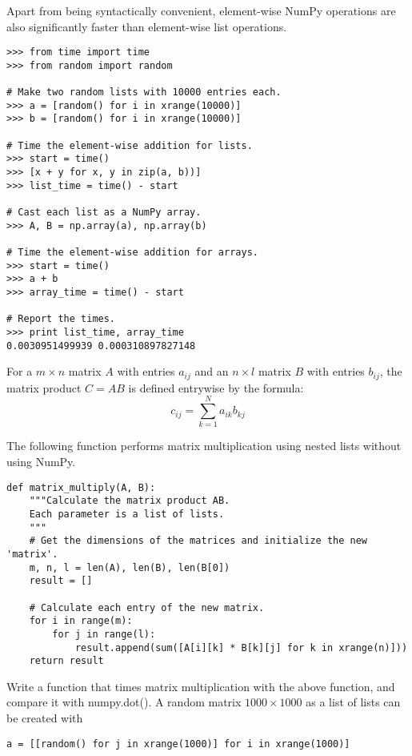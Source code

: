 Apart from being syntactically convenient, element-wise NumPy operations are also significantly faster than element-wise list operations.

\begin{lstlisting}
>>> from time import time
>>> from random import random

# Make two random lists with 10000 entries each.
>>> a = [random() for i in xrange(10000)]
>>> b = [random() for i in xrange(10000)]

# Time the element-wise addition for lists.
>>> start = time()
>>> [x + y for x, y in zip(a, b))]
>>> list_time = time() - start

# Cast each list as a NumPy array.
>>> A, B = np.array(a), np.array(b)

# Time the element-wise addition for arrays.
>>> start = time()
>>> a + b
>>> array_time = time() - start

# Report the times.
>>> print list_time, array_time
0.0030951499939 0.000310897827148
\end{lstlisting}

\begin{problem} %
For a $m\times n$ matrix $A$ with entries $a_{ij}$ and an $n\times l$ matrix $B$ with entries $b_{ij}$, the matrix product $C = AB$ is defined entrywise by the formula:
\[c_{ij} = \sum_{k=1}^N a_{ik}b_{kj}\]

The following function performs matrix multiplication using nested lists without using NumPy.

\begin{lstlisting}
def matrix_multiply(A, B):
    """Calculate the matrix product AB.
    Each parameter is a list of lists.
    """
    # Get the dimensions of the matrices and initialize the new 'matrix'.
    m, n, l = len(A), len(B), len(B[0])
    result = []

    # Calculate each entry of the new matrix.
    for i in range(m):
        for j in range(l):
            result.append(sum([A[i][k] * B[k][j] for k in xrange(n)]))
    return result
\end{lstlisting}

Write a function that times matrix multiplication with the above function, and compare it with numpy.dot().
A random matrix $1000\times 1000$ as a list of lists can be created with

\begin{lstlisting}
a = [[random() for j in xrange(1000)] for i in xrange(1000)]
\end{lstlisting}

\end{problem}

